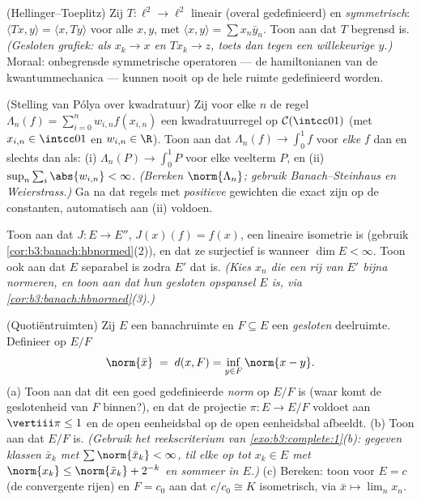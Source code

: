\begin{exercise}[$\star\star\star$]\label{exo:b3:banach:8}
(Hellinger--Toeplitz) Zij $T \colon \ell^2 \to \ell^2$ lineair
(overal gedefinieerd) en \emph{symmetrisch}: $\langle Tx, y\rangle
= \langle x, Ty\rangle$ voor alle $x, y$, met $\langle x, y
\rangle = \sum x_n\bar y_n$. Toon aan dat $T$ begrensd is.
\emph{(Gesloten grafiek: als $x_k \to x$ en $Tx_k \to z$, toets
dan tegen een willekeurige $y$.)} Moraal: onbegrensde
symmetrische operatoren --- de hamiltonianen van de
kwantummechanica --- kunnen nooit op de hele ruimte gedefinieerd
worden.
\end{exercise}

\begin{exercise}[$\star\star\star$]\label{exo:b3:banach:9}
(Stelling van Pólya over kwadratuur) Zij voor elke $n$ de regel
$\Lambda_n(f) = \sum_{i=0}^{n} w_{i,n}f(x_{i,n})$ een
kwadratuurregel op $\mathcal C(\intcc01)$ (met $x_{i,n} \in
\intcc01$ en $w_{i,n} \in \R$). Toon aan dat $\Lambda_n(f) \to
\int_0^1f$ voor \emph{elke}  $f$ dan en slechts dan als:
(i) $\Lambda_n(P) \to \int_0^1P$ voor elke veelterm $P$, en (ii)
$\sup_n\sum_i\abs{w_{i,n}} < \infty$. \emph{(Bereken
$\norm{\Lambda_n}$; gebruik Banach--Steinhaus en Weierstrass.)}
Ga na dat regels met \emph{positieve} gewichten die exact zijn op
de constanten, automatisch aan (ii) voldoen.
\end{exercise}

\begin{exercise}[$\star\star$]\label{exo:b3:banach:10}
Toon aan dat $J \colon E \to E''$, $J(x)(f) = f(x)$, een lineaire
isometrie is (gebruik \cref{cor:b3:banach:hbnormed}(2)), en dat ze
surjectief is wanneer $\dim E < \infty$. Toon ook aan dat $E$
separabel is zodra $E'$ dat is. \emph{(Kies $x_n$ die een 
rij van $E'$ bijna normeren, en toon aan dat hun gesloten
opspansel $E$ is, via \cref{cor:b3:banach:hbnormed}(3).)}
\end{exercise}

\begin{exercise}[$\star\star$]\label{exo:b3:banach:11}
(Quotiëntruimten) Zij $E$ een banachruimte en $F \subseteq E$ een
\emph{gesloten} deelruimte. Definieer op $E/F$
\[
\norm{\bar x} \;=\; d(x, F) = \inf_{y\in F}\norm{x - y} .
\]
(a) Toon aan dat dit een goed gedefinieerde \emph{norm} op $E/F$
is (waar komt de geslotenheid van $F$ binnen?), en dat de
projectie $\pi \colon E \to E/F$ voldoet aan $\vertiii\pi \leq 1$
en de open eenheidsbal op de open eenheidsbal afbeeldt.
(b) Toon aan dat $E/F$  is. \emph{(Gebruik het
reekscriterium van \cref{exo:b3:complete:1}(b): gegeven klassen
$\bar x_k$ met $\sum\norm{\bar x_k} < \infty$, til elke op tot
$x_k \in E$ met $\norm{x_k} \leq \norm{\bar x_k} + 2^{-k}$ en
sommeer in $E$.)}
(c) Bereken: toon voor $E = c$ (de convergente rijen) en $F =
c_0$ aan dat $c/c_0 \cong K$ isometrisch, via $\bar x \mapsto
\lim_nx_n$.
\end{exercise}

